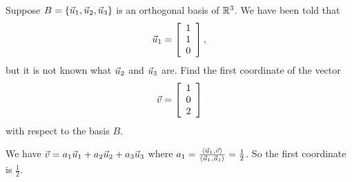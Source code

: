 \documentclass{ximera}
\begin{document}
\begin{exercise}
  Suppose $B=\set{\vect{u}_1,\vect{u}_2,\vect{u}_3}$ is an
  orthogonal basis of $\R^3$. We have been told that
  \begin{equation*}
    \vect{u}_1 = \startmat{c} 1 \\ 1 \\ 0 \stopmat,
  \end{equation*}
  but it is not known what $\vect{u}_2$ and $\vect{u}_3$ are. Find the
  first coordinate of the vector
  \begin{equation*}
    \vect{v} = \startmat{c} 1 \\ 0 \\ 2 \stopmat
  \end{equation*}
  with respect to the basis $B$.
  \begin{solution}
    We have $\vect{v} = a_1\vect{u}_1 + a_2\vect{u}_2 + a_3\vect{u}_3$
    where
    $a_1 =
    \frac{\iprod{\vect{u}_1,\vect{v}}}{\iprod{\vect{u}_1,\vect{u}_1}}
    = \frac{1}{2}$. So the first coordinate is $\frac{1}{2}$.
  \end{solution}
\end{exercise}
\end{document}
